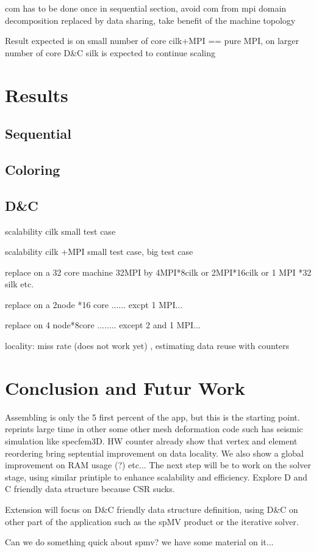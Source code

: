 \documentclass{IOS-Book-Article}
\begin{document}
com has to be done once in sequential section, avoid com from mpi domain decomposition replaced by data sharing, take benefit of the machine topology


Result expected is on small number of core cilk+MPI == pure MPI, on larger number of core D\&C silk is expected to continue scaling

\section{Results}

\subsection{Sequential}
\subsection{Coloring}
\subsection{D&C}

scalability cilk small test case

scalability cilk +MPI small test case, big test case


replace on a 32 core machine 32MPI by 4MPI*8cilk or 2MPI*16cilk or 1 MPI *32 silk etc.

replace on a 2node *16 core   ...... excpt 1 MPI...

replace on 4 node*8core ........ except 2 and 1 MPI...


locality: miss rate (does not work yet) , estimating data reuse with counters

\section{Conclusion and Futur Work}

Assembling is only the 5 first percent of the app, but this is the starting point. reprints large time in other some other mesh deformation code such has seismic simulation like specfem3D.
HW counter already show that vertex and element reordering bring septential improvement on data locality. We also show a global improvement on RAM usage (?) etc... The next step will be to work
on the solver stage, using similar printiple to enhance scalability and efficiency. Explore D and C friendly data structure because CSR sucks.  

 Extension will focus on D\&C friendly data structure definition, using D\&C on other part of the  application such as the spMV product or the iterative solver. 

Can we do something quick about spmv? we have some material on it...



\end{document}
